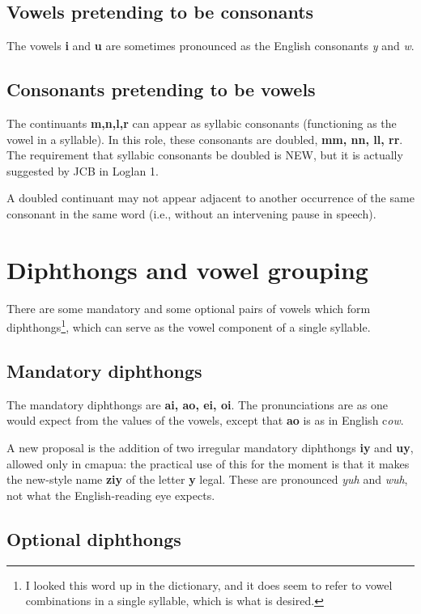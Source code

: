 \documentclass[12pt]{book}
\begin{document}
\subsection{Vowels pretending to be consonants}

The vowels {\bf i} and {\bf u} are sometimes pronounced as the English consonants {\em y} and {\em w}.

\subsection{Consonants pretending to be vowels}

The continuants {\bf m,n,l,r} can appear as syllabic consonants (functioning as the vowel in a syllable).  In this role, these consonants are doubled,
{\bf mm, nn, ll, rr}.  The requirement that syllabic consonants be doubled is NEW, but it is actually suggested by JCB in Loglan 1.

A doubled continuant may not appear adjacent to another occurrence of the same consonant in the same word (i.e., without an intervening pause in speech).

\section{Diphthongs and vowel grouping}

There are some mandatory and some optional pairs of vowels which form diphthongs\footnote{I looked this word up in the dictionary, and it does seem to refer to vowel combinations in a single syllable, which is what is desired.}, which can serve as the vowel component of a single syllable.

\subsection{Mandatory diphthongs}

The mandatory diphthongs are {\bf ai, ao, ei, oi}.  The pronunciations are as one would expect from the values of the vowels, except that
{\bf ao} is as in English c{\em ow}.

A new proposal is the addition of two irregular mandatory diphthongs {\bf iy} and {\bf uy}, allowed only in cmapua:  the practical use of this
for the moment is that it makes the new-style name {\bf ziy} of the letter {\bf y} legal.  These are pronounced {\em yuh\/} and
{\em wuh\/}, not what the English-reading  eye expects.

\subsection{Optional diphthongs}
\end{document}
